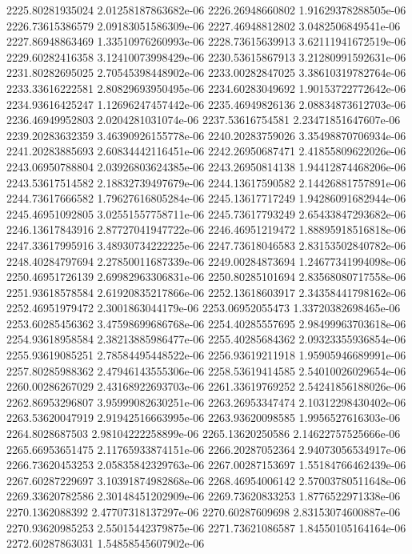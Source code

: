 {2225.80281935024 2.01258187863682e-06
2226.26948660802 1.91629378288505e-06
2226.73615386579 2.09183051586309e-06
2227.46948812802 3.0482506849541e-06
2227.86948863469 1.33510976260993e-06
2228.73615639913 3.62111941672519e-06
2229.60282416358 3.12410073998429e-06
2230.53615867913 3.21280991592631e-06
2231.80282695025 2.70545398448902e-06
2233.00282847025 3.38610319782764e-06
2233.33616222581 2.80829693950495e-06
2234.60283049692 1.90153722772642e-06
2234.93616425247 1.12696247457442e-06
2235.46949826136 2.08834873612703e-06
2236.46949952803 2.0204281031074e-06
2237.53616754581 2.23471851647607e-06
2239.20283632359 3.46390926155778e-06
2240.20283759026 3.35498870706934e-06
2241.20283885693 2.60834442116451e-06
2242.26950687471 2.41855809622026e-06
2243.06950788804 2.03926803624385e-06
2243.26950814138 1.94412874468206e-06
2243.53617514582 2.18832739497679e-06
2244.13617590582 2.14426881757891e-06
2244.73617666582 1.79627616805284e-06
2245.13617717249 1.94286091682944e-06
2245.46951092805 3.02551557758711e-06
2245.73617793249 2.65433847293682e-06
2246.13617843916 2.87727041947722e-06
2246.46951219472 1.88895918516818e-06
2247.33617995916 3.48930734222225e-06
2247.73618046583 2.83153502840782e-06
2248.40284797694 2.27850011687339e-06
2249.00284873694 1.24677341994098e-06
2250.46951726139 2.69982963306831e-06
2250.80285101694 2.83568080717558e-06
2251.93618578584 2.61920835217866e-06
2252.13618603917 2.34358441798162e-06
2252.46951979472 2.3001863044179e-06
2253.06952055473 1.33720382698465e-06
2253.60285456362 3.47598699686768e-06
2254.40285557695 2.98499963703618e-06
2254.93618958584 2.38213885986477e-06
2255.40285684362 2.09323355936854e-06
2255.93619085251 2.78584495448522e-06
2256.93619211918 1.95905946689991e-06
2257.80285988362 2.47946143555306e-06
2258.53619414585 2.54010026029654e-06
2260.00286267029 2.43168922693703e-06
2261.33619769252 2.54241856188026e-06
2262.86953296807 3.95999082630251e-06
2263.26953347474 2.10312298430402e-06
2263.53620047919 2.91942516663995e-06
2263.93620098585 1.9956527616303e-06
2264.8028687503 2.98104222258899e-06
2265.13620250586 2.14622757525666e-06
2265.66953651475 2.11765933874151e-06
2266.20287052364 2.94073056534917e-06
2266.73620453253 2.05835842329763e-06
2267.00287153697 1.55184766462439e-06
2267.60287229697 3.10391874982868e-06
2268.46954006142 2.57003780511648e-06
2269.33620782586 2.30148451202909e-06
2269.73620833253 1.8776522971338e-06
2270.1362088392 2.47707318137297e-06
2270.60287609698 2.83153074600887e-06
2270.93620985253 2.55015442379875e-06
2271.73621086587 1.84550105164164e-06
2272.60287863031 1.54858545607902e-06
}
